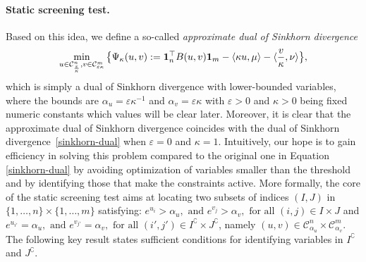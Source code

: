 \paragraph{Static screening test.} Based on this idea, we define a so-called \emph{approximate dual of Sinkhorn divergence} 
\begin{equation} 
\label{screen-sinkhorn}
\min_{u \in \mathcal{C}^n_{\frac \varepsilon \kappa}, v\in \mathcal{C}^m_{\varepsilon\kappa}} \big\{\Psi_{\kappa}(u,v):= \mathbf{1}_n^\top B(u,v)\mathbf{1}_m - \langle \kappa u, \mu \rangle - \langle \frac v\kappa, \nu \rangle \big\},
\end{equation}
which is simply a dual of Sinkhorn divergence with lower-bounded variables, where the bounds
are $\alpha_u = \varepsilon \kappa^{-1}$ and $\alpha_v = \varepsilon \kappa$ with $\varepsilon > 0$ and $\kappa > 0$ being fixed numeric constants which values will be
clear later. 
Moreover, it is clear that the approximate dual of Sinkhorn divergence coincides with the dual of Sinkhorn divergence~\eqref{sinkhorn-dual} when $\varepsilon=0$ and $\kappa=1$.
 {Intuitively, our hope is to gain efficiency in solving
this problem compared to the original one in Equation \eqref{sinkhorn-dual} by avoiding optimization of variables smaller than the threshold and by identifying
those that make the constraints active. } More formally, 
 the core of the static screening test aims at locating two subsets of indices $(I, J)$ in $\{1, \ldots, n\}\times\{1, \ldots, m\}$ satisfying: $e^{u_i} > \alpha_u, \text{ and } e^{v_j} > \alpha_v, \text{ for all } (i,j) \in I \times J$ and 
$e^{u_{i'}} = \alpha_u, \text{ and } e^{v_{j'}} = \alpha_v, \text{ for all } (i',j') \in I^\complement \times J^\complement$, namely $(u,v) \in \mathcal{C}^n_{\alpha_u}\times \mathcal{C}^m_{\alpha_v}$. {The following key result states sufficient conditions for identifying variables in $I^\complement$ and $J^\complement$.}
 
